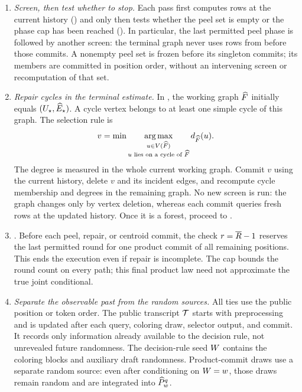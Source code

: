 \begin{enumerate}
 \item \emph{Screen, then test whether to stop.}
 Each pass first computes rows at the current history
 () and only then tests whether the peel set is empty
 or the phase cap has been reached ().
 In particular, the last permitted peel phase is followed by another
 screen: the terminal graph never uses rows from before those commits.
 A nonempty peel set is frozen before its singleton commits; its members
 are committed in position order, without an intervening screen or
 recomputation of that set.

 \item \emph{Repair cycles in the terminal estimate.}
 In , the working graph $\widehat F$ initially
 equals $(U_{\star},\widehat E_\star)$. A cycle vertex belongs to
 at least one simple cycle of this graph. The selection rule is
 \[
 v=\min\operatorname*{arg\,max}_{
       \substack{u\in V(\widehat F)\\
                 u\text{ lies on a cycle of }\widehat F}}
       d_{\widehat F}(u).
 \]
 The degree is measured in the whole current working graph.
 Commit $v$ using the current history, delete $v$ and its incident edges,
 and recompute cycle membership and degrees in the remaining graph.
 No new screen is run: the graph changes only by vertex deletion, whereas
 each commit queries fresh rows at the updated history.
 Once it is a forest, proceed to .

 \item \AlgoGuardTarget.
 Before each peel, repair, or centroid commit, the check
 $r=\overline R-1$ reserves the last permitted round for one product
 commit of all remaining positions. This ends the execution even if
 repair is incomplete. The cap bounds the round count on every path;
 this final product law need not approximate the true joint conditional.

 \item \emph{Separate the observable past from the random sources.}
 All ties use the public position or token order.
 The public transcript $\mathcal T$ starts with preprocessing
 and is updated after each query, coloring draw, selector output, and
 commit. It records only information already available to the decision
 rule, not unrevealed future randomness.
 The decision-rule seed $W$ contains the coloring blocks
 and auxiliary draft randomness. Product-commit draws use a separate
 random source: even after conditioning on $W=w$, those
 draws remain random and are integrated into
 $\widehat P_{w}^{q}$.
\end{enumerate}

